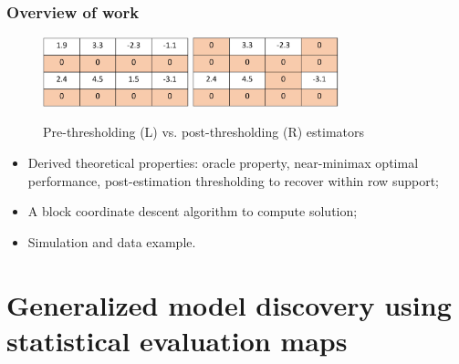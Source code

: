 \documentclass[handout,10pt]{beamer}
\begin{document}

\begin{frame}
\frametitle{Overview of work}

\begin{figure}\begin{center}
   \includegraphics[height=2cm]{threspre}
   \hspace{2em}
   \includegraphics[height=2cm]{threspost}
   \label{fig:fig2}
\end{center}
\caption*{Pre-thresholding (L) vs. post-thresholding (R) estimators}
\end{figure}

\begin{itemize}
\item Derived theoretical properties: oracle property, near-minimax optimal performance, post-estimation thresholding to recover within row support;

\vspace{1em}
\item A block coordinate descent algorithm to compute solution;

\vspace{1em}
\item Simulation and data example.
\end{itemize}
\end{frame}



\section{Generalized model discovery using statistical evaluation maps}
\end{document}
